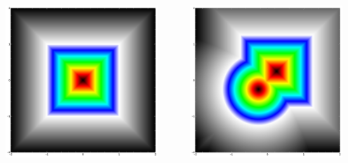 \documentclass{beamer}
\begin{document}
\begin{frame}
\begin{columns}
\begin{column}{0.33\textwidth}
    \includegraphics[width=0.9\textwidth, center]{implicit_square.jpg}
  \end{column}
  \begin{column}{0.33\textwidth}
    \includegraphics[width=0.9\textwidth, center]{implicit_union_square_circle.jpg}
  \end{column}
\end{columns}
\end{frame}
\end{document}
